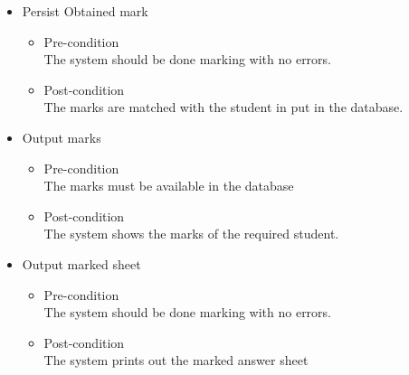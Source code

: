 \documentclass{article}
\begin{document}
\begin{itemize}
		\item Persist Obtained mark
			\begin{itemize}
				\item Pre-condition \\
					 The system should be done marking with no errors.
				\item Post-condition \\
					 The marks are matched with the student in put in the database.
			\end{itemize}

		\item Output marks
			\begin{itemize}
				\item Pre-condition \\
					 The marks must be available in the database
				\item Post-condition \\
					 The system shows the marks of the required student.
			\end{itemize}
		\item Output marked sheet
			\begin{itemize}
				\item Pre-condition \\
					 The system should be done marking with no errors.
				\item Post-condition \\
					 The system prints out the marked answer sheet
			\end{itemize}

			


\end{itemize} 
\end{document}
